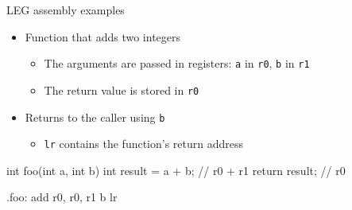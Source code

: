 \begin{frame}[fragile]{LEG assembly examples}

\begin{itemize}
    \item Function that adds two integers
    \begin{itemize}
        \item The arguments are passed in registers: \texttt{a} in \texttt{r0}, \texttt{b} in \texttt{r1}
        \item The return value is stored in \texttt{r0}
    \end{itemize}
    \item Returns to the caller using \texttt{b}
    \begin{itemize}
        \item \texttt{lr} contains the function's return address
    \end{itemize}
\end{itemize}

\begin{minipage}[t]{0.50\linewidth}
\begin{codebox}
int foo(int a, int b) {
    int result = a + b;   // r0 + r1
    return result;        // r0
}
\end{codebox}
\end{minipage}
\begin{minipage}[t]{0.49\linewidth}
\begin{codebox}
.foo:
    add r0, r0, r1
    b lr

\end{codebox}
\end{minipage}

\end{frame}


